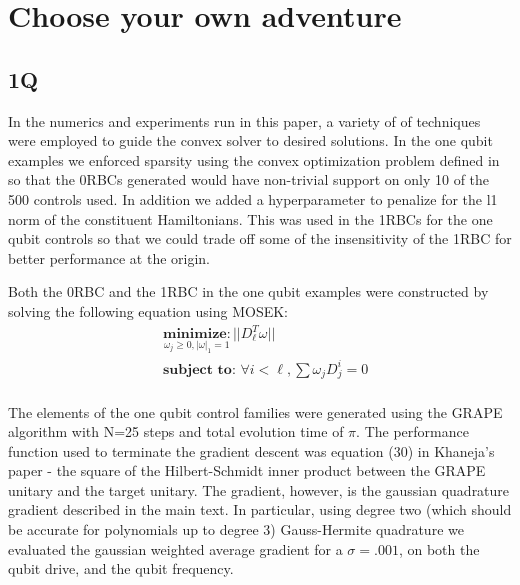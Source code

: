 \documentclass[aps,nofootinbib,pra,notitlepage,twocolumn]{revtex4-1}
\begin{document}
\section{Choose your own adventure}
\subsection{1Q}
In the numerics and experiments run in this paper, a variety of of techniques were employed to guide the convex solver to desired solutions. In the one qubit examples we enforced sparsity using the convex optimization problem defined in \cite{NIPS2012_4504} so that the 0RBCs generated would have non-trivial support on only 10 of the 500 controls used. In addition we added a hyperparameter to penalize for the l1 norm of the constituent Hamiltonians. This was used in the 1RBCs for the one qubit controls so that we could trade off some of the insensitivity of the 1RBC for better performance at the origin.

Both the 0RBC and the 1RBC in the one qubit examples were constructed by solving the following equation using MOSEK:
\begin{equation}\label{eq:minimization}
  \begin{split}
    &\underset{\omega_j\geq0, |\omega|_1=1}{\textbf{minimize}: } ||D_{\ell}^T\omega||\\
    &\textbf{subject to: } \forall i<\ell, \sum \omega_jD_j^i=0\\
  \end{split}
\end{equation}

The elements of the one qubit control families were generated using the GRAPE algorithm with N=25 steps and total evolution time of $\pi$. The performance function used to terminate the gradient descent was equation (30) in Khaneja's paper - the square of the Hilbert-Schmidt inner product between the GRAPE unitary and the target unitary. The gradient, however, is the gaussian quadrature gradient described in the main text. In particular, using degree two (which should be accurate for polynomials up to degree 3) Gauss-Hermite quadrature we evaluated the gaussian weighted average gradient for a $\sigma=.001$, on both the qubit drive, and the qubit frequency. 
\end{document}
